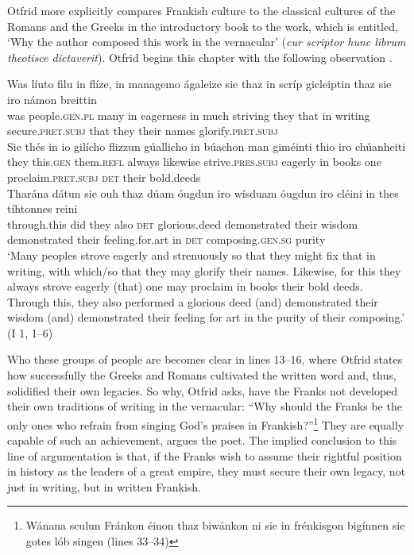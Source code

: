 \noindent Otfrid more explicitly compares Frankish culture to the classical cultures of the Romans and the Greeks in the introductory book to the work, which is entitled, ‘Why the author composed this work in the vernacular’ (\textit{cur scriptor hunc librum theotisce dictaverit}). Otfrid begins this chapter with the following observation .

\ea%
    \label{ex:5:1}
\gll Was líuto      filu    in  flíze,          in  managemo   ágaleize sie   thaz  in  scríp  gicleiptin       thaz   sie     iro      námon breittin\\
was people.\textsc{gen.pl}  many   in   eagerness  in   much     striving they   that  in  writing  secure.\textsc{pret.subj}  that   they  their  names glorify.\textsc{pret.subj}\\

\gll Sie   thés     in       io    gilícho  flizzun       gúallicho in  búachon    man   giméinti            thio   iro    chúanheiti\\
they   this.\textsc{gen}  them.\textsc{refl}  always  likewise  strive.\textsc{pres.subj}  eagerly in   books     one  proclaim.\textsc{pret.subj}  \textsc{det}   their  bold.deeds\\

\gll Tharána      dátun  sie    ouh  thaz   dúam          óugdun      iro  wísduam óugdun       iro    cléini           in  thes    tíhtonnes       reini\\
through.this   did   they    also   \textsc{det}   glorious.deed  demonstrated   their wisdom demonstrated  their  feeling.for.art  in   \textsc{det}    composing.\textsc{gen.sg}  purity\\

\glt ‘Many peoples strove eagerly and strenuously so that they might fix that in writing, with which/so that they may glorify their names. Likewise, for this they always strove eagerly (that) one may proclaim in books their bold deeds. Through this, they also performed a glorious deed (and) demonstrated their wisdom (and) demonstrated their feeling for art in the purity of their composing.’ (I 1, 1--6)
    \z

\noindent Who these groups of people are becomes clear in lines 13--16, where Otfrid states how successfully the Greeks and Romans cultivated the written word and, thus, solidified their own legacies. So why, Otfrid asks, have the Franks not developed their own traditions of writing in the vernacular: “Why should the Franks be the only ones who refrain from singing God’s praises in Frankish?”\footnote{\textrm{Wánana sculun Fránkon éinon thaz biwánkon ni sie in frénkisgon bigínnen sie gotes lób singen (lines 33--34)}} They are equally capable of such an achievement, argues the poet. The implied conclusion to this line of argumentation is that, if the Franks wish to assume their rightful position in history as the leaders of a great empire, they must secure their own legacy, not just in writing, but in written Frankish.

